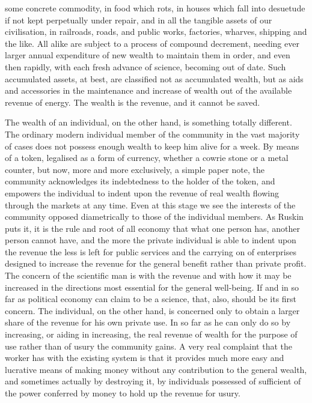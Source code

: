 \documentclass[10.5pt,twoside]{book}
\newcommand{\origpage}[1]{\clearpage\setcounter{page}{#1}}
\begin{document}
\origpage{14}

\noindent some concrete commodity, in food which rots, in houses which fall
into desuetude if not kept perpetually under repair, and in all the tangible
assets of our civilisation, in railroads, roads, and public works, factories,
wharves, shipping and the like. All alike are subject to a process of compound
decrement, needing ever larger annual expenditure of new wealth to maintain
them in order, and even then rapidly, with each fresh advance of science,
becoming out of date. Such accumulated assets, at best, are classified not as
accumulated wealth, but as aids and accessories in the maintenance and
increase of wealth out of the available revenue of energy. The wealth is the
revenue, and it cannot be saved.

The wealth of an individual, on the other hand, is something totally
different. The ordinary modern individual member of the community in the vast
majority of cases does not possess enough wealth to keep him alive for a week.
By means of a token, legalised as a form of currency, whether a cowrie stone
or a metal counter, but now, more and more exclusively, a simple paper note,
the community acknowledges its indebtedness to the holder of the token, and
empowers the individual to indent upon the revenue of real wealth flowing
through the markets at any time. Even at this stage we see the interests of
the community opposed diametrically to those of the individual members. As
Ruskin puts it, it is the rule and root of all economy that what one person
has, another person cannot have, and the more the private individual is able
to indent upon the revenue the less is left for public services and the
carrying on of enterprises designed to increase the revenue for the general
benefit rather than private profit. The concern of the scientific man is with
the revenue and with how it may be increased in the directions most essential
for the general well-being. If and in so far as political economy can claim to
be a science, that, also, should be its first concern. The individual, on the
other hand, is concerned only to obtain a larger share of the revenue for his
own private use. In so far as he can only do so by increasing, or aiding in
increasing, the real revenue of wealth for the purpose of use rather than of
usury the community gains. A very real complaint that the worker has with the
existing system is that it provides much more easy and lucrative means of
making money without any contribution to the general wealth, and sometimes
actually by destroying it, by individuals possessed of sufficient of the power
conferred by money to hold up the revenue for usury.
\end{document}
